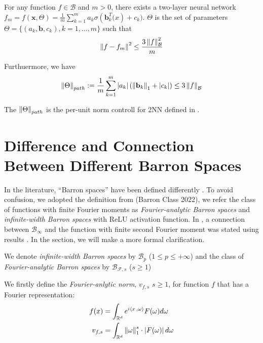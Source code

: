 \begin{theorem} 
    For any function $f \in \mathcal{B}$ and $m > 0$, there exists a two-layer neural network
    $f_m = f(\mathbf{x}, \Theta) = \frac{1}{m}\sum_{k=1}^m a_k \sigma(\mathbf{b}_k^T \mathbf(x) + c_k)$. 
    $\Theta$ is the set of parameters $\Theta = \{(a_k, \mathbf{b}, c_k), k=1,\dots,m\}$ such that
    \begin{equation*}
        \left\| f - f_m \right\|^2 \leq \frac{3\left\| f \right\|_{\mathcal{B}}^2}{m}
    \end{equation*}

    Furthuermore, we have 
    \begin{equation}
        \left\| \Theta \right\|_{path} := \frac{1}{m} \sum_{k=1}^m \left| a_k \right| (\left\| \mathbf{b}_k \right\|_1 + \left| c_k \right|) 
        \leq 3\left\| f \right\|_{\mathcal{B}}
        \end{equation}
\end{theorem}

The $\left\| \Theta \right\|_{path}$ is the per-unit norm controll
for 2NN defined in \cite{neyshaburNormBasedCapacityControl2015}. 

\section{Difference and Connection Between Different Barron Spaces}

In the literature, ``Barron spaces'' have been defined differently \cite{eBanachSpacesAssociated2020, ePrioriEstimatesPopulation2019}. To avoid confusion, we adopted the definition from \TOCITE(Barron Class 2022), we refer the class of functions with finite Fourier moments as \textit{Fourier-analytic Barron spaces} and \textit{infinite-width Barron spaces} with ReLU activation function. In \cite{ePrioriEstimatesPopulation2019, eBarronSpaceFlowinduced2021}, a connection between $\mathcal{B}_{\infty}$ and the function with finite second Fourier moment was stated using results \cite{klusowskiRiskBoundsHighdimensional2018}. In the section, we will make a more formal clarification.

We denote \textit{infinite-width Barron spaces} by $\mathcal{B}_p$ ($1 \leq p \leq +\infty$) and the class of \textit{Fourier-analytic Barron spaces} by $\mathcal{B}_{\mathcal{F}, s}$ ($s \geq 1$)

We firstly define the \textit{Fourier-anlytic norm}, $v_{f, s}$ $s \geq 1$, for function $f$ that has a Fourier representation:
\begin{align}
    f(x) &= \int_{\mathbb{R}^d} e^{i\left\langle x\, , \omega \right\rangle} F(\omega) d\omega \label{eq:fourier_rep} \\
    v_{f, s} &= \int_{\mathbb{R}^d} \left\| \omega \right\|_1^s \cdot \left| F(\omega) \right| d\omega \label{eq:fourier_norm}
\end{align}

